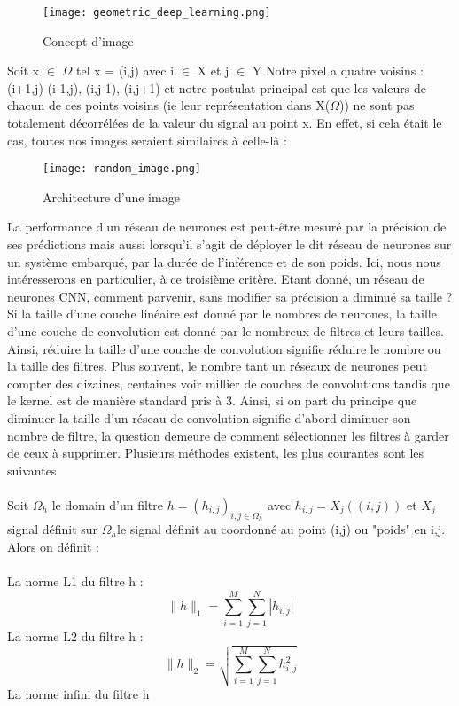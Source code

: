 \documentclass[12pt,a4paper]{article}
\begin{document}
\begin{figure}[H] %
    \centering    %
    \texttt{[image: geometric\_deep\_learning.png]} %
    \caption{Concept d'image} %
    \label{fig:mon_image} %
\end{figure}
Soit x $\in$ $\Omega$ tel x = (i,j) avec i $\in$ X et j $\in$ Y 
Notre pixel a quatre voisins : (i+1,j) (i-1,j), (i,j-1), (i,j+1) et notre postulat principal est que les valeurs de chacun de ces points voisins (ie leur représentation dans X($\Omega$)) ne sont pas totalement décorrélées de la valeur du signal au point x. En effet, si cela était le cas, toutes nos images seraient similaires à celle-là : 
\begin{figure}[H] %
    \centering    %
    \texttt{[image: random\_image.png]} %
    \caption{Architecture d'une image} %
    \label{fig:mon_image} %
\end{figure}
La performance d'un réseau de neurones est peut-être mesuré par la précision de ses prédictions mais aussi lorsqu'il s'agit de déployer le dit réseau de neurones sur un système embarqué, par la durée de l'inférence et de son poids. Ici, nous nous intéresserons en particulier, à ce troisième critère. Etant donné, un réseau de neurones CNN, comment parvenir, sans modifier sa précision a diminué sa taille ? Si la taille d'une couche linéaire est donné par le nombres de  neurones, la taille d'une couche de convolution est donné par le nombreux de filtres et leurs tailles. Ainsi, réduire la taille d'une couche de convolution signifie réduire le nombre ou la taille des filtres. Plus souvent, le nombre tant un réseaux de neurones peut compter des dizaines, centaines voir millier de couches de convolutions tandis que le kernel est de manière standard pris à 3. Ainsi, si on part du principe que diminuer la taille d'un réseau de convolution signifie d'abord diminuer son nombre de filtre, la question demeure de comment sélectionner les filtres à garder de ceux à supprimer. Plusieurs méthodes existent, les plus courantes sont les suivantes 
\\ \\ Soit $\Omega_{h}$ le domain d'un filtre $ h = (h_{i,j})_{i,j\in\Omega_h}$ avec $h_{i,j} = X_j((i,j))$ et $X_j$ signal définit sur $\Omega_h$le signal définit au coordonné au point (i,j) ou "poids" en i,j. Alors on définit : 
\\
\\
La norme L1 du filtre h :  
\[
\|h\|_1 = \sum_{i=1}^{M} \sum_{j=1}^{N} |h_{i,j}| 
\]
La norme L2 du filtre h :
\[
\|h\|_2 = \sqrt{\sum_{i=1}^{M} \sum_{j=1}^{N} h_{i,j}^2}
\]
La norme infini du filtre h 
\end{document}
